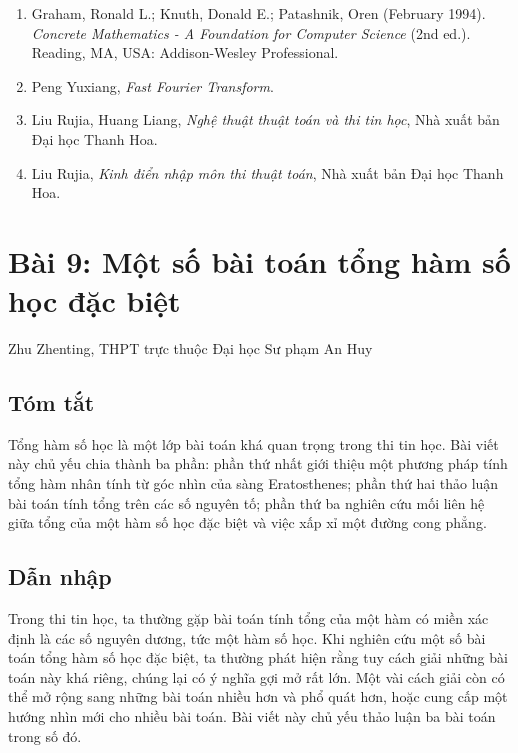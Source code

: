 \documentclass[11pt]{article}
\begin{document}
\begin{enumerate}
  \item Graham, Ronald L.; Knuth, Donald E.; Patashnik, Oren (February 1994).
  \emph{Concrete Mathematics - A Foundation for Computer Science} (2nd ed.).
  Reading, MA, USA: Addison-Wesley Professional.
  \item Peng Yuxiang, \emph{Fast Fourier Transform}.
  \item Liu Rujia, Huang Liang, \emph{Nghệ thuật thuật toán và thi tin học},
  Nhà xuất bản Đại học Thanh Hoa.
  \item Liu Rujia, \emph{Kinh điển nhập môn thi thuật toán}, Nhà xuất bản Đại
  học Thanh Hoa.
\end{enumerate}

\section{Bài 9: Một số bài toán tổng hàm số học đặc biệt}

\begin{center}
Zhu Zhenting, THPT trực thuộc Đại học Sư phạm An Huy
\end{center}

\subsection*{Tóm tắt}

Tổng hàm số học là một lớp bài toán khá quan trọng trong thi tin học. Bài viết
này chủ yếu chia thành ba phần: phần thứ nhất giới thiệu một phương pháp tính
tổng hàm nhân tính từ góc nhìn của sàng Eratosthenes; phần thứ hai thảo luận
bài toán tính tổng trên các số nguyên tố; phần thứ ba nghiên cứu mối liên hệ
giữa tổng của một hàm số học đặc biệt và việc xấp xỉ một đường cong phẳng.

\subsection*{Dẫn nhập}

Trong thi tin học, ta thường gặp bài toán tính tổng của một hàm có miền xác
định là các số nguyên dương, tức một hàm số học. Khi nghiên cứu một số bài toán
tổng hàm số học đặc biệt, ta thường phát hiện rằng tuy cách giải những bài toán
này khá riêng, chúng lại có ý nghĩa gợi mở rất lớn. Một vài cách giải còn có
thể mở rộng sang những bài toán nhiều hơn và phổ quát hơn, hoặc cung cấp một
hướng nhìn mới cho nhiều bài toán. Bài viết này chủ yếu thảo luận ba bài toán
trong số đó.
\end{document}
